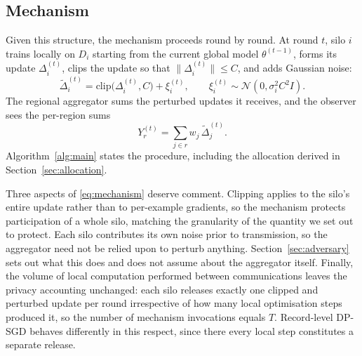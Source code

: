 \documentclass[acmsmall,screen,review,anonymous]{acmart}
\theoremstyle{acmdefinition}%
\begin{document}
\subsection{Mechanism}

Given this structure, the mechanism proceeds round by round. At round $t$, silo $i$ trains locally on $D_i$ starting from the current global
model $\theta^{(t-1)}$, forms its update $\Delta_i^{(t)}$, clips the update so
that $\|\Delta_i^{(t)}\| \le C$, and adds Gaussian noise:
\begin{equation}
\tilde{\Delta}_i^{(t)} = \mathrm{clip}\big(\Delta_i^{(t)}, C\big) + \xi_i^{(t)},
\qquad
\xi_i^{(t)} \sim \mathcal{N}\!\left(0, \sigma_i^2 C^2 I\right).
\label{eq:mechanism}
\end{equation}
The regional aggregator sums the perturbed updates it receives, and the observer
sees the per-region sums
\begin{equation}
Y_r^{(t)} = \sum_{j \in r} w_j \, \tilde{\Delta}_j^{(t)} .
\label{eq:observation}
\end{equation}
Algorithm~\ref{alg:main} states the procedure, including the allocation derived in
Section~\ref{sec:allocation}.

Three aspects of \eqref{eq:mechanism} deserve comment. Clipping applies to the
silo's entire update rather than to per-example gradients, so the mechanism
protects participation of a whole silo, matching the granularity of the quantity
we set out to protect. Each silo contributes its own noise prior to transmission,
so the aggregator need not be relied upon to perturb anything. Section~\ref{sec:adversary}
sets out what this does and does not assume about the aggregator itself. Finally, the volume of local
computation performed between communications leaves the privacy accounting
unchanged: each silo releases exactly one clipped and perturbed update per round
irrespective of how many local optimisation steps produced it, so the number of
mechanism invocations equals $T$. Record-level DP-SGD behaves differently in this
respect, since there every local step constitutes a separate release.
\end{document}
